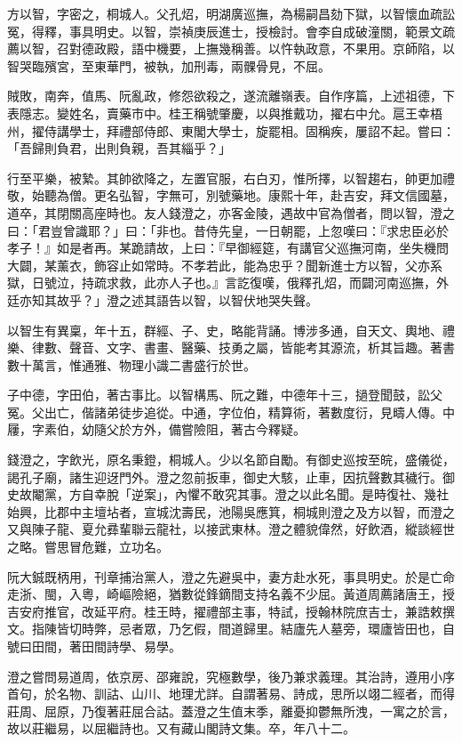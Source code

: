 \begin{pinyinscope}
方以智，字密之，桐城人。父孔炤，明湖廣巡撫，為楊嗣昌劾下獄，以智懷血疏訟冤，得釋，事具明史。以智，崇禎庚辰進士，授檢討。會李自成破潼關，範景文疏薦以智，召對德政殿，語中機要，上撫幾稱善。以忤執政意，不果用。京師陷，以智哭臨殯宮，至東華門，被執，加刑毒，兩髁骨見，不屈。

賊敗，南奔，值馬、阮亂政，修怨欲殺之，遂流離嶺表。自作序篇，上述祖德，下表隱志。變姓名，賣藥市中。桂王稱號肇慶，以與推戴功，擢右中允。扈王幸梧州，擢侍講學士，拜禮部侍郎、東閣大學士，旋罷相。固稱疾，屢詔不起。嘗曰：「吾歸則負君，出則負親，吾其緇乎？」

行至平樂，被縶。其帥欲降之，左置官服，右白刃，惟所擇，以智趨右，帥更加禮敬，始聽為僧。更名弘智，字無可，別號藥地。康熙十年，赴吉安，拜文信國墓，道卒，其閉關高座時也。友人錢澄之，亦客金陵，遇故中官為僧者，問以智，澄之曰：「君豈曾識耶？」曰：「非也。昔侍先皇，一日朝罷，上忽嘆曰：『求忠臣必於孝子！』如是者再。某跪請故，上曰：『早御經筵，有講官父巡撫河南，坐失機問大闢，某薰衣，飾容止如常時。不孝若此，能為忠乎？聞新進士方以智，父亦系獄，日號泣，持疏求救，此亦人子也。』言訖復嘆，俄釋孔炤，而闢河南巡撫，外廷亦知其故乎？」澄之述其語告以智，以智伏地哭失聲。

以智生有異稟，年十五，群經、子、史，略能背誦。博涉多通，自天文、輿地、禮樂、律數、聲音、文字、書畫、醫藥、技勇之屬，皆能考其源流，析其旨趣。著書數十萬言，惟通雅、物理小識二書盛行於世。

子中德，字田伯，著古事比。以智構馬、阮之難，中德年十三，撾登聞鼓，訟父冤。父出亡，偕諸弟徒步追從。中通，字位伯，精算術，著數度衍，見疇人傳。中屨，字素伯，幼隨父於方外，備嘗險阻，著古今釋疑。

錢澄之，字飲光，原名秉鐙，桐城人。少以名節自勵。有御史巡按至皖，盛儀從，謁孔子廟，諸生迎迓門外。澄之忽前扳車，御史大駭，止車，因抗聲數其穢行。御史故閹黨，方自幸脫「逆案」，內懼不敢究其事。澄之以此名聞。是時復社、幾社始興，比郡中主壇坫者，宣城沈壽民，池陽吳應箕，桐城則澄之及方以智，而澄之又與陳子龍、夏允彞輩聯云龍社，以接武東林。澄之體貌偉然，好飲酒，縱談經世之略。嘗思冒危難，立功名。

阮大鋮既柄用，刊章捕治黨人，澄之先避吳中，妻方赴水死，事具明史。於是亡命走浙、閩，入粵，崎嶇險絕，猶數從鋒鏑間支持名義不少屈。黃道周薦諸唐王，授吉安府推官，改延平府。桂王時，擢禮部主事，特試，授翰林院庶吉士，兼誥敕撰文。指陳皆切時弊，忌者眾，乃乞假，間道歸里。結廬先人墓旁，環廬皆田也，自號曰田間，著田間詩學、易學。

澄之嘗問易道周，依京房、邵雍說，究極數學，後乃兼求義理。其治詩，遵用小序首句，於名物、訓詁、山川、地理尤詳。自謂著易、詩成，思所以翊二經者，而得莊周、屈原，乃復著莊屈合詁。蓋澄之生值末季，離憂抑鬱無所洩，一寓之於言，故以莊繼易，以屈繼詩也。又有藏山閣詩文集。卒，年八十二。


\end{pinyinscope}
